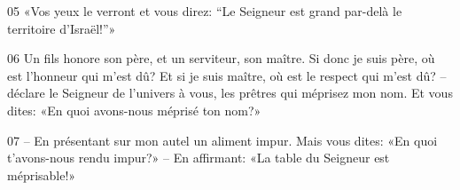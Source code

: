 
05 «Vos yeux le verront et vous direz: “Le Seigneur est grand par-delà le territoire d’Israël!”»

06 Un fils honore son père, et un serviteur, son maître. Si donc je suis père, où est l’honneur qui m’est dû? Et si je suis maître, où est le respect qui m’est dû? – déclare le Seigneur de l’univers à vous, les prêtres qui méprisez mon nom. Et vous dites: «En quoi avons-nous méprisé ton nom?»

07 – En présentant sur mon autel un aliment impur. Mais vous dites: «En quoi t’avons-nous rendu impur?» – En affirmant: «La table du Seigneur est méprisable!»
